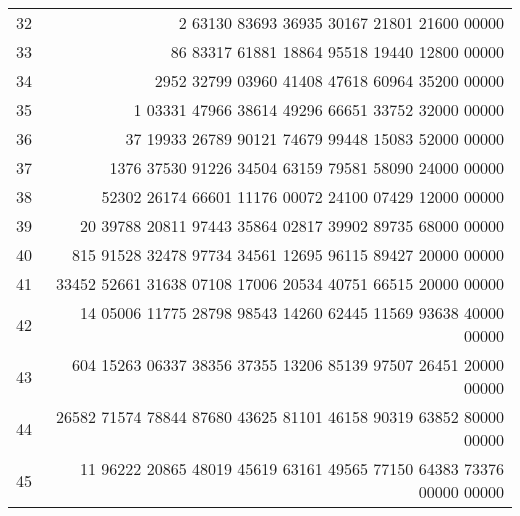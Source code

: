 \documentclass[10pt, a4paper]{article}
\begin{document}
\begin{center}
\begin{longtable}{l | r}
        32 & 2 63130 83693 36935 30167 21801 21600 00000 \\
        33 & 86 83317 61881 18864 95518 19440 12800 00000 \\
        34 & 2952 32799 03960 41408 47618 60964 35200 00000 \\
        35 & 1 03331 47966 38614 49296 66651 33752 32000 00000 \\
        \hline
        36 & 37 19933 26789 90121 74679 99448 15083 52000 00000 \\
        37 & 1376 37530 91226 34504 63159 79581 58090 24000 00000 \\
        38 & 52302 26174 66601 11176 00072 24100 07429 12000 00000 \\
        39 & 20 39788 20811 97443 35864 02817 39902 89735 68000 00000 \\
        40 & 815 91528 32478 97734 34561 12695 96115 89427 20000 00000 \\
        \hline
        41 & 33452 52661 31638 07108 17006 20534 40751 66515 20000 00000 \\
        42 & 14 05006 11775 28798 98543 14260 62445 11569 93638 40000 00000 \\
        43 & 604 15263 06337 38356 37355 13206 85139 97507 26451 20000 00000 \\
        44 & 26582 71574 78844 87680 43625 81101 46158 90319 63852 80000 00000 \\
        45 & 11 96222 20865 48019 45619 63161 49565 77150 64383 73376 00000 00000 \\
        \hline
    \end{longtable}
\end{center}
\pagebreak
\end{document}
